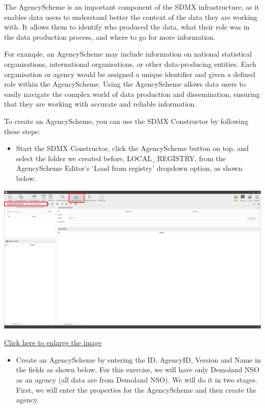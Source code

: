 \documentclass[
]{book}
\providecommand{\tightlist}{%
  \setlength{\itemsep}{0pt}\setlength{\parskip}{0pt}}
\begin{document}
The AgencyScheme is an important component of the SDMX infrastructure, as it enables data users to understand better the context of the data they are working with. It allows them to identify who produced the data, what their role was in the data production process, and where to go for more information.

For example, an AgencyScheme may include information on national statistical organisations, international organisations, or other data-producing entities. Each organisation or agency would be assigned a unique identifier and given a defined role within the AgencyScheme. Using the AgencyScheme allows data users to easily navigate the complex world of data production and dissemination, ensuring that they are working with accurate and reliable information.

To create an AgencyScheme, you can use the SDMX Constructor by following these steps:

\begin{itemize}
\tightlist
\item
  Start the SDMX Constructor, click the AgencyScheme button on top, and select the folder we created before, LOCAL\_REGISTRY, from the AgencyScheme Editor's `Load from registry' dropdown option, as shown below.
\end{itemize}

\begin{center}\includegraphics[width=1\linewidth]{./images/image060} \end{center}

\href{images/image060.png}{Click here to enlarge the image}

\begin{itemize}
\tightlist
\item
  Create an AgencyScheme by entering the ID, AgencyID, Version and Name in the fields as shown below. For this exercise, we will have only Demoland NSO as an agency (all data are from Demoland NSO). We will do it in two stages. First, we will enter the properties for the AgencyScheme and then create the agency.
\end{itemize}
\end{document}
